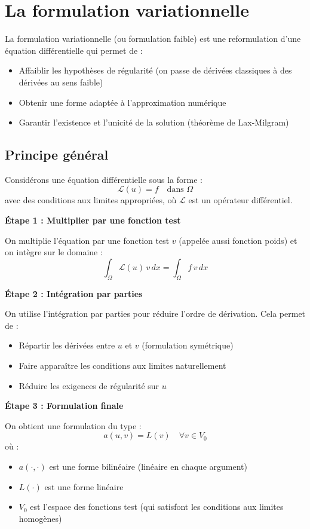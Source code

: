\documentclass[11pt,a4paper]{report}
\begin{document}
\section*{La formulation variationnelle}

\begin{rappelsBox}
La formulation variationnelle (ou formulation faible) est une reformulation d'une équation différentielle qui permet de :
\begin{itemize}
    \item Affaiblir les hypothèses de régularité (on passe de dérivées classiques à des dérivées au sens faible)
    \item Obtenir une forme adaptée à l'approximation numérique
    \item Garantir l'existence et l'unicité de la solution (théorème de Lax-Milgram)
\end{itemize}
\end{rappelsBox}

\subsection*{Principe général}

Considérons une équation différentielle sous la forme :
\[
\mathcal{L}(u) = f \quad \text{dans } \Omega
\]
avec des conditions aux limites appropriées, où $\mathcal{L}$ est un opérateur différentiel.

\textbf{Étape 1 : Multiplier par une fonction test}

On multiplie l'équation par une fonction test $v$ (appelée aussi fonction poids) et on intègre sur le domaine :
\[
\int_\Omega \mathcal{L}(u) \, v \, dx = \int_\Omega f \, v \, dx
\]

\textbf{Étape 2 : Intégration par parties}

On utilise l'intégration par parties pour réduire l'ordre de dérivation. Cela permet de :
\begin{itemize}
    \item Répartir les dérivées entre $u$ et $v$ (formulation symétrique)
    \item Faire apparaître les conditions aux limites naturellement
    \item Réduire les exigences de régularité sur $u$
\end{itemize}

\textbf{Étape 3 : Formulation finale}

On obtient une formulation du type :
\[
a(u, v) = L(v) \quad \forall v \in V_0
\]
où :
\begin{itemize}
    \item $a(\cdot, \cdot)$ est une forme bilinéaire (linéaire en chaque argument)
    \item $L(\cdot)$ est une forme linéaire
    \item $V_0$ est l'espace des fonctions test (qui satisfont les conditions aux limites homogènes)
\end{itemize}
\end{document}
